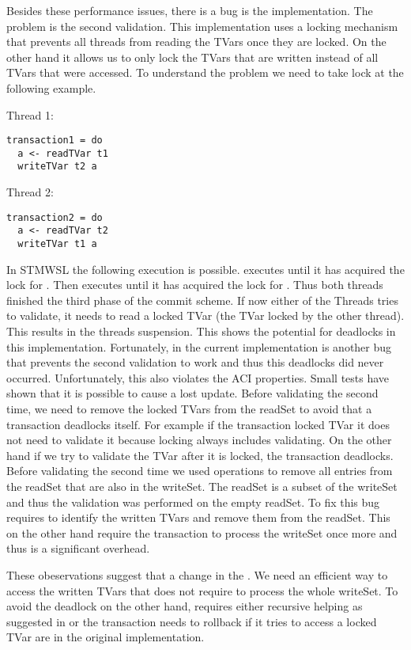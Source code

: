 Besides these performance issues, there is a bug is the implementation. The problem is the second validation. 
This implementation uses a locking mechanism that prevents all threads from reading the TVars once they are locked.
On the other hand it allows us to only lock the TVars that are written instead of all TVars that were accessed.
To understand the problem we need to take lock at the following example.
\par\noindent
\begin{minipage}[t]{.45\textwidth}
Thread 1:
\begin{lstlisting}[frame=lrtb]
transaction1 = do
  a <- readTVar t1
  writeTVar t2 a
\end{lstlisting}
\end{minipage}
\hfill
\begin{minipage}[t]{.45\textwidth}
Thread 2:
\begin{lstlisting}[frame=lrtb]
transaction2 = do
  a <- readTVar t2
  writeTVar t1 a
\end{lstlisting}
\end{minipage}
In STMWSL the following execution is possible.  executes until it has acquired the lock for 
. Then  executes until it has acquired the lock for . Thus both threads
finished the third phase of the commit scheme. If now either of the Threads tries to validate, it needs to 
read a locked TVar (the TVar locked by the other thread). This results in the threads suspension. This 
shows the potential for deadlocks in this implementation. Fortunately, in the current implementation is
another bug that prevents the second validation to work and thus this deadlocks did never occurred.
Unfortunately, this also violates the ACI properties. Small tests have shown that it is possible to 
cause a lost update. Before validating the second time, we need to remove the locked TVars from the 
readSet to avoid that a transaction deadlocks itself. For example if the transaction locked TVar 
it does not need to validate it because locking always includes validating. On the other hand if we try to
validate the TVar after it is locked, the transaction deadlocks. Before validating the second time 
we used  operations to remove all entries from the readSet that are also in the writeSet. 
The readSet is a subset of the writeSet and thus the validation was performed on the empty readSet.
To fix this bug requires to identify the written TVars and remove them from the readSet. This on the other
hand require the transaction to process the writeSet once more and thus is a significant overhead. 

These obeservations suggest that a change in the . We need an efficient way to access 
the written TVars that does not require to process the whole writeSet. To avoid the deadlock on the other hand,
requires either recursive helping as suggested in \parencite{lockfreedom} or the transaction needs to 
rollback if it tries to access a locked TVar are in the original implementation.
